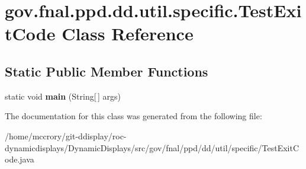 \hypertarget{classgov_1_1fnal_1_1ppd_1_1dd_1_1util_1_1specific_1_1TestExitCode}{\section{gov.\-fnal.\-ppd.\-dd.\-util.\-specific.\-Test\-Exit\-Code Class Reference}
\label{classgov_1_1fnal_1_1ppd_1_1dd_1_1util_1_1specific_1_1TestExitCode}
}
\subsection*{Static Public Member Functions}
\begin{DoxyCompactItemize}
\item 
\hypertarget{classgov_1_1fnal_1_1ppd_1_1dd_1_1util_1_1specific_1_1TestExitCode_a8476b4eafc7a7c6175b412dbfe9f0b9f}{static void {\bfseries main} (String\mbox{[}$\,$\mbox{]} args)}\label{classgov_1_1fnal_1_1ppd_1_1dd_1_1util_1_1specific_1_1TestExitCode_a8476b4eafc7a7c6175b412dbfe9f0b9f}

\end{DoxyCompactItemize}


The documentation for this class was generated from the following file\-:\begin{DoxyCompactItemize}
\item 
/home/mccrory/git-\/ddisplay/roc-\/dynamicdisplays/\-Dynamic\-Displays/src/gov/fnal/ppd/dd/util/specific/Test\-Exit\-Code.\-java\end{DoxyCompactItemize}

